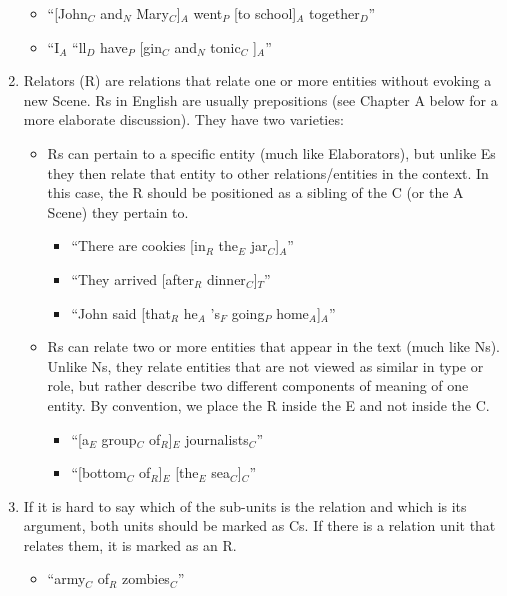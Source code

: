 \documentclass[11pt]{article}
\begin{document}
\begin{enumerate}
\begin{itemize}
\item
``[John$_C$ and$_N$ Mary$_C$]$_A$ went$_P$ [to school]$_A$ together$_D$''
\item
``I$_A$ ``ll$_D$ have$_P$ [gin$_C$ and$_N$ tonic$_C$ ]$_A$''
\end{itemize}

\item
Relators (R) are relations that relate one or more entities without evoking a new Scene. Rs in English are usually prepositions (see Chapter A below for a more elaborate discussion). They have two varieties:

\begin{itemize}
\item
Rs can pertain to a specific entity (much like Elaborators), but unlike Es they then relate that entity to other relations/entities in the context. In this case, the R should be positioned as a sibling of the C (or the A Scene) they pertain to.

\begin{itemize}
\item
``There are cookies [in$_R$ the$_E$ jar$_C$]$_A$''
\item
``They arrived [after$_R$ dinner$_C$]$_T$''
\item
``John said [that$_R$ he$_A$ 's$_F$ going$_P$ home$_A$]$_A$''
\end{itemize}

\item
Rs can relate two or more entities that appear in the text (much like Ns). Unlike Ns, they relate entities that are not viewed as similar in type or role, but rather describe two different components of meaning of one entity. By convention, we place the R inside the E and not inside the C.
\begin{itemize}
\item ``[a$_E$ group$_C$ of$_R$]$_E$ journalists$_C$''
\item ``[bottom$_C$ of$_R$]$_E$ [the$_E$ sea$_C$]$_C$''
\end{itemize}

\end{itemize}

\item
If it is hard to say which of the sub-units is the relation and which is its argument, both units should be marked as Cs. If there is a relation unit that relates them, it is marked as an R.
\begin{itemize}
\item
``army$_C$ of$_R$ zombies$_C$''
\end{itemize}


\end{enumerate}
\end{document}
